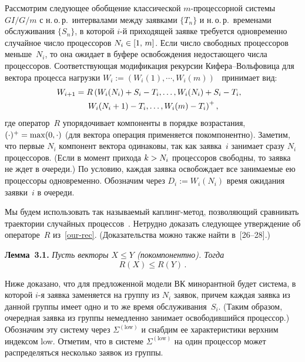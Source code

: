 \begin{multicols}{2}
Рассмотрим следующее обобщение классической  $m$-про\-цес\-сор\-ной
системы $GI/G/m$ с н.\,о.\,р.\ интервалами между заявками $\{T_n\}$ и
н.\,о.\,р.\ временами обслуживания $\{S_n\}$, в которой $i$-й приходящей
заявке требуется одновременно случайное число процессоров $N_{i}\hm\in[1,\, m]$.
Если число свободных процессоров меньше~$N_i$, то
она ожидает в буфере освобождения недостающего числа процессоров.
Соответствующая модификация рекурсии Ки\-фе\-ра--Воль\-фо\-ви\-ца для вектора
процесса нагрузки $W_i:=(W_{i}(1),\cdots, W_{i}(m))$~\cite{Kiefer}
принимает вид:
\begin{multline}
\label{our-rec}
 \hspace*{-6.13364pt}W_{i+1}=R\left(W_{i}(N_{i})+S_{i}-T_{i},\ldots,W_{i}(N_{i})
+S_{i}-T_{i},\right.\\ 
\left.W_{i}(N_{i}+1)-T_{i},\ldots,
W_{i}(m)-T_{i}\right)^{+},
\end{multline}
где оператор~$R$ упорядочивает компоненты в порядке возрастания,
$(\cdot)^{+}\hm=\max(0,\cdot)$ (для вектора операция применяется покомпонентно).
Заметим, что первые $N_{i}$ компонент вектора одинаковы, так как
заявка~$i$ занимает сразу  $N_{i}$ процессоров. (Если в момент
прихода $k\hm>N_{i}$ процессоров свободны, то заявка не ждет в
очереди.)  По условию, каждая заявка освобождает все занимаемые ею
процессоры одновременно. Обозначим через $D_{i}:=W_{i}(N_{i})$ время
ожидания заявки~$i$ в очереди.

Мы будем использовать так называемый кап\-линг-ме\-тод, позволяющий
сравнивать траектории случайных процессов~\cite{Shiryaev}. Нетрудно
доказать следующее  утверждение об операторе~$R$ из~\eqref{our-rec}.
(Доказательства можно также найти в~[26--28].)

\medskip

\noindent
\textbf{Лемма~3.1.}
\textit{Пусть векторы $X\leqslant Y$ (покомпонентно).
Тогда}
\begin{equation*}
R(X)\leqslant R(Y)\,.
\end{equation*}

Ниже доказано, что  для предложенной модели ВК минорантной  будет
система, в которой $i$-я заявка заменяется на группу из  $N_{i}$
заявок, причем каждая заявка  из данной группы  имеет одно и то же
время обслуживания~$S_{i}$. (Таким образом, очередная заявка из
группы немедленно занимает освободившийся процессор.) Обозначим эту
систему через $\Sigma^{(\mathrm{low})}$ и снабдим ее характеристики верхним
индексом low. Отметим, что в системе $\Sigma^{(\mathrm{low})}$   на один
процессор может распределяться  несколько заявок  из группы.


\end{multicols}
